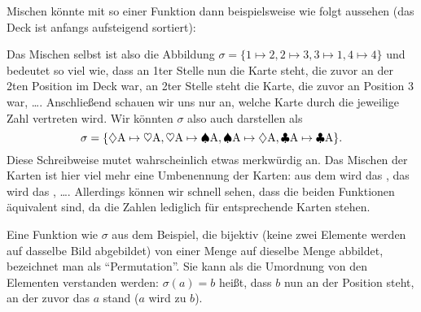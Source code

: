\documentclass[../../main.tex]{subfiles}
\begin{document}
\begin{example}{}
    Mischen könnte mit so einer Funktion dann beispielsweise wie folgt aussehen (das Deck ist anfangs aufsteigend sortiert):
    \begin{center}
    \end{center}
    Das Mischen selbst ist also die Abbildung $\sigma = \{1\mapsto 2, 2\mapsto 3, 3\mapsto 1, 4\mapsto 4\}$ und bedeutet so viel wie, dass an 1ter Stelle nun die Karte steht, die zuvor an der 2ten Position im Deck war, an 2ter Stelle steht die Karte, die zuvor an Position 3 war, \dots. Anschließend schauen wir uns nur an, welche Karte durch die jeweilige Zahl vertreten wird. Wir könnten $\sigma$ also auch darstellen als
    \[\sigma = \{\diamondsuit\text{A}\mapsto \heartsuit\text{A}, \heartsuit\text{A}\mapsto \spadesuit\text{A}, \spadesuit\text{A}\mapsto \diamondsuit\text{A}, \clubsuit\text{A}\mapsto \clubsuit\text{A}\}.\]
    Diese Schreibweise mutet wahrscheinlich etwas merkwürdig an. Das Mischen der Karten ist hier viel mehr eine Umbenennung der Karten: aus dem \AceDiamond{} wird das \AceHeart, das \AceHeart{} wird das \AceSpade, \dots. Allerdings können wir schnell sehen, dass die beiden Funktionen äquivalent sind, da die Zahlen lediglich für entsprechende Karten stehen.
\end{example}

Eine Funktion wie $\sigma$ aus dem Beispiel, die bijektiv (keine zwei Elemente werden auf dasselbe Bild abgebildet) von einer Menge auf dieselbe Menge abbildet, bezeichnet man als \enquote{Permutation}. Sie kann als die Umordnung von den Elementen verstanden werden: $\sigma(a) = b$ heißt, dass $b$ nun an der Position steht, an der zuvor das $a$ stand ($a$ wird zu $b$).
\end{document}
